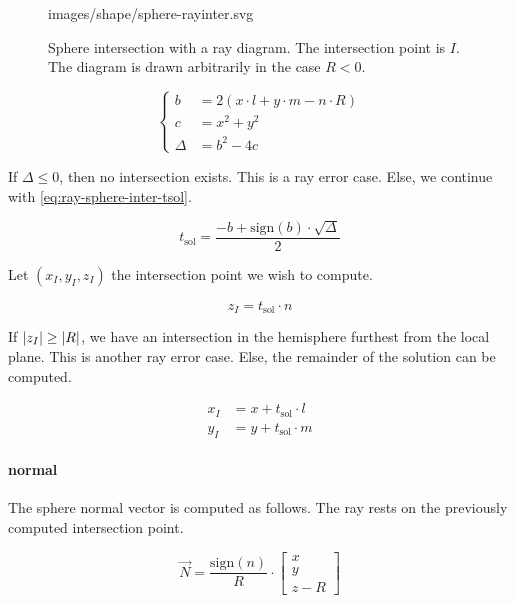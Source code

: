 \begin{figure} \caption{\label{fig:sphere-inter} Sphere intersection with
a ray diagram. The intersection point is $I$. The diagram is drawn arbitrarily
in the case $R<0$.}

           {images/shape/sphere-rayinter.svg}
\end{figure}

\begin{equation} \label{eq:ray-sphere-inter1}
\begin{cases}
b &= 2 (x \cdot l + y \cdot m - n \cdot R) \\
c &= x^2 + y^2 \\
\Delta &= b^2 - 4 c
\end{cases}
\end{equation}

If $\Delta \leq 0$, then no intersection exists. This is a ray error case.
Else, we continue with \cref{eq:ray-sphere-inter-tsol}.

\begin{equation} \label{eq:ray-sphere-inter-tsol}
t_\textrm{sol} = \frac{-b + \textrm{sign}(b) \cdot \sqrt{\Delta}}{2}
\end{equation}

Let $(x_I, y_I, z_I)$ the intersection point we wish to compute.

\begin{equation}
z_I = t_\textrm{sol} \cdot n
\end{equation}

If $\abs{z_I} \geq \abs{R}$, we have an intersection in the hemisphere furthest
from the local plane. This is another ray error case. Else, the remainder of
the solution can be computed.

\begin{equation} \begin{aligned}
x_I &= x + t_\textrm{sol} \cdot l \\
y_I &= y + t_\textrm{sol} \cdot m
\end{aligned} \end{equation}

\paragraph{normal}
The sphere normal vector is computed as follows. The ray rests on the previously
computed intersection point.

\begin{equation}
\overrightarrow{N} =
\frac{\textrm{sign}(n)}{R} \cdot
\begin{bmatrix} x \\ y \\ z - R \end{bmatrix}
\end{equation}


